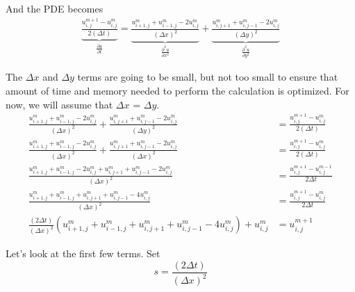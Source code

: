 \documentclass[11pt]{article}
\begin{document}
And the PDE becomes \begin{equation}
\begin{split}
\underbrace{\frac{u_{i,j}^{m + 1} - u_{i,j}^{m}}{2 (\Delta t)}}_{\frac {\partial u}{\partial t}} =\underbrace{\frac{u_{i + 1 ,j}^m + u_{i - 1 ,j}^m - 2 u_{i,j}^m}{(\Delta x)^2}}_{\frac {\partial^2 u}{\partial x^2}} + \underbrace{\frac{u_{i,j + 1}^m + u_{i,j - 1}^m - 2 u_{i,j}^m}{(\Delta y)^2}}_{\frac {\partial^2 u}{\partial y^2}} 
\end{split}
\end{equation}

The \(\Delta x\) and \(\Delta y\) terms are going to be small, but not
too small to ensure that amount of time and memory needed to perform the
calculation is optimized. For now, we will assume that \(\Delta x\) =
\(\Delta y\). \begin{equation}
\begin{split} 
\frac{u_{i + 1 ,j}^m + u_{i - 1 ,j}^m - 2 u_{i, j}^m}{(\Delta x)^2} + \frac{u_{i,j + 1}^m + u_{i,j - 1}^m - 2 u_{i,j}^m}{(\Delta y)^2} &= \frac{u_{i,j}^{m + 1} - u_{i,j}^{m}}{2 (\Delta t)} \\
\frac{u_{i + 1 ,j}^m + u_{i - 1 ,j}^m - 2 u_{i, j}^m}{(\Delta x)^2} + \frac{u_{i,j + 1}^m + u_{i,j - 1}^m - 2 u_{i,j}^m}{(\Delta x)^2} &= \frac{u_{i,j}^{m + 1} - u_{i,j}^{m}}{2 (\Delta t)} \\
\frac{u_{i + 1 ,j}^m + u_{i - 1 ,j}^m - 2 u_{i, j}^m + u_{i,j + 1}^m + u_{i,j - 1}^m - 2 u_{i,j}^m}{(\Delta x)^2} &= \frac{u_{i,j}^{m + 1} - u_{i,j}^{m - 1}}{2 \Delta t} \\
\frac{u_{i + 1 ,j}^m + u_{i - 1 ,j}^m + u_{i,j + 1}^m + u_{i,j - 1}^m - 4 u_{i,j}^m}{(\Delta x)^2} &= \frac{u_{i,j}^{m + 1} - u_{i,j}^{m}}{2 \Delta t} \\
\frac{(2 \Delta t)}{(\Delta x)^2}(u_{i + 1 ,j}^m + u_{i - 1 ,j}^m + u_{i,j + 1}^m + u_{i,j - 1}^m - 4 u_{i,j}^m) + u_{i,j}^{m} &= u_{i,j}^{m + 1}
\end{split}
\end{equation}

    Let's look at the first few terms. Set \begin{equation}
s = \frac{(2 \Delta t)}{(\Delta x)^2}
\end{equation}
\end{document}
